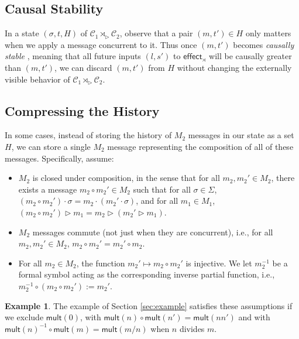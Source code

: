 \documentclass[acmsmall,nonacm,12pt]{acmart}
\newcommand{\mc}[1]{\ensuremath{\mathcal{#1}}}
\newcommand{\msf}[1]{\ensuremath{\mathsf{#1}}}
\newcommand{\act}{\triangleright}
\theoremstyle{plain}
\theoremstyle{definition}
\newtheorem{myex}[mythm]{Example}
\begin{document}
\subsection{Causal Stability}
In a state $(\sigma, t, H)$ of $\mc{C}_1 \rtimes_\act \mc{C}_2$, observe that a pair $(m, t') \in H$ only matters when we apply a message concurrent to it.  Thus once $(m, t')$ becomes \textit{causally stable} \cite[\S 5.2]{pure_op_based_crdts_extended}, meaning that all future inputs $(l, s')$ to $\msf{effect}_\rtimes$ will be causally greater than $(m, t')$, we can discard $(m, t')$ from $H$ without changing the externally visible behavior of $\mc{C}_1 \rtimes_\act \mc{C}_2$.


\subsection{Compressing the History}
In some cases, instead of storing the history of $M_2$ messages in our state as a set $H$, we can store a single $M_2$ message representing the composition of all of these messages.  Specifically, assume:
\begin{itemize}
  \item $M_2$ is closed under composition, in the sense that for all $m_2, m_2' \in M_2$, there exists a message $m_2 \circ m_2' \in M_2$ such that for all $\sigma \in \Sigma$, $(m_2 \circ m_2') \cdot \sigma = m_2 \cdot (m_2' \cdot \sigma)$, and for all $m_1 \in M_1$, $(m_2 \circ m_2') \act m_1 = m_2 \act (m_2' \act m_1)$.
  \item $M_2$ messages commute (not just when they are concurrent), i.e., for all $m_2, m_2' \in M_2$, $m_2 \circ m_2' = m_2' \circ m_2$.
  \item For all $m_2 \in M_2$, the function $m_2' \mapsto m_2 \circ m_2'$ is injective.  We let $m_2^{-1}$ be a formal symbol acting as the corresponding inverse partial function, i.e., $m_2^{-1} \circ (m_2 \circ m_2') := m_2'$.
\end{itemize}
\begin{myex}
The example of Section \ref{sec:example} satisfies these assumptions if we exclude $\msf{mult}(0)$, with $\msf{mult}(n) \circ \msf{mult}(n') = \msf{mult}(nn')$ and with $\msf{mult}(n)^{-1} \circ \msf{mult}(m) = \msf{mult}(m/n)$ when $n$ divides $m$.
\end{myex}
\end{document}
